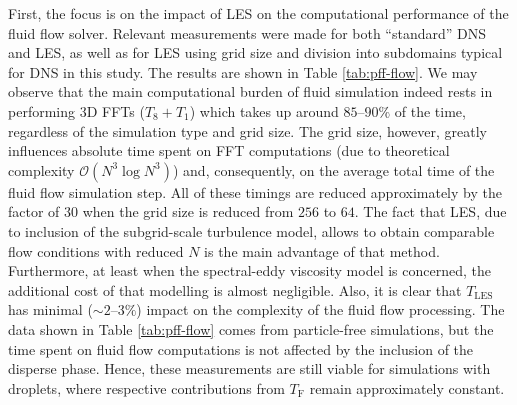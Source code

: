 \documentclass{pracamgren}
\begin{document}
\medskip

First, the focus is on the impact of LES on the computational performance of the fluid flow solver.
Relevant measurements were made for both ``standard'' DNS and LES, as well as for LES using grid size and division into subdomains typical for DNS in this study.
The results are shown in Table \ref{tab:pff-flow}.
We may observe that the main computational burden of fluid simulation indeed rests in performing 3D FFTs ($T_8 + T_1$) which takes up around \mbox{$85$--$90 \%$} of the time, regardless of the simulation type and grid size.
The grid size, however, greatly influences absolute time spent on FFT computations (due to theoretical complexity $\mathcal{O}(N^3 \log N^3)$) and, consequently, on the average total time of the fluid flow simulation step.
All of these timings are reduced approximately by the factor of $30$ when the grid size is reduced from $256$ to $64$.
The fact that LES, due to inclusion of the subgrid-scale turbulence model, allows to obtain comparable flow conditions with reduced $N$ is the main advantage of that method.
Furthermore, at least when the spectral-eddy viscosity model is concerned, the additional cost of that modelling is almost negligible.
Also, it is clear that $T_{\text{LES}}$ has minimal ($\sim 2$--$3 \%$) impact on the complexity of the fluid flow processing.
The data shown in Table \ref{tab:pff-flow} comes from particle-free simulations, but the time spent on fluid flow computations is not affected by the inclusion of the disperse phase.
Hence, these measurements are still viable for simulations with droplets, where respective contributions from $T_{\text{F}}$ remain approximately constant. 
\end{document}

